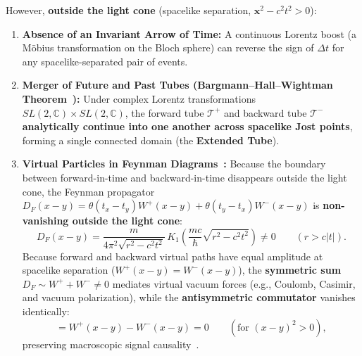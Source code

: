 \documentclass[11pt,a4paper]{article}
\begin{document}
However, \textbf{outside the light cone} (spacelike separation, $\mathbf{x}^2 - c^2 t^2 > 0$):
\begin{enumerate}
    \item \textbf{Absence of an Invariant Arrow of Time:} A continuous Lorentz boost (a M\"obius transformation on the Bloch sphere) can reverse the sign of $\Delta t$ for any spacelike-separated pair of events.
    \item \textbf{Merger of Future and Past Tubes (Bargmann--Hall--Wightman Theorem~\cite{StreaterWightman1964}):} Under complex Lorentz transformations $SL(2,\mathbb{C}) \times SL(2,\mathbb{C})$, the forward tube $\mathcal{T}^+$ and backward tube $\mathcal{T}^-$ \textbf{analytically continue into one another across spacelike Jost points}, forming a single connected domain (the \textbf{Extended Tube}).
    \item \textbf{Virtual Particles in Feynman Diagrams~\cite{Feynman1949}:} Because the boundary between forward-in-time and backward-in-time disappears outside the light cone, the Feynman propagator $D_F(x - y) = \theta(t_x - t_y) W^+(x-y) + \theta(t_y - t_x) W^-(x-y)$ is \textbf{non-vanishing outside the light cone}:
    \begin{equation}
    D_F(x - y) = \frac{m}{4\pi^2 \sqrt{r^2 - c^2 t^2}}\, K_1\!\left(\frac{mc}{\hbar}\sqrt{r^2 - c^2 t^2}\right) \neq 0 \qquad (r > c|t|).
    \end{equation}
    Because forward and backward virtual paths have equal amplitude at spacelike separation ($W^+(x-y) = W^-(x-y)$), the \textbf{symmetric sum} $D_F \sim W^+ + W^- \neq 0$ mediates virtual vacuum forces (e.g., Coulomb, Casimir, and vacuum polarization), while the \textbf{antisymmetric commutator} vanishes identically:
    \begin{equation}
    [\phi(x), \phi(y)] = W^+(x - y) - W^-(x - y) = 0 \qquad (\text{for } (x-y)^2 > 0),
    \end{equation}
    preserving macroscopic signal causality~\cite{StreaterWightman1964}.
\end{enumerate}
\end{document}
